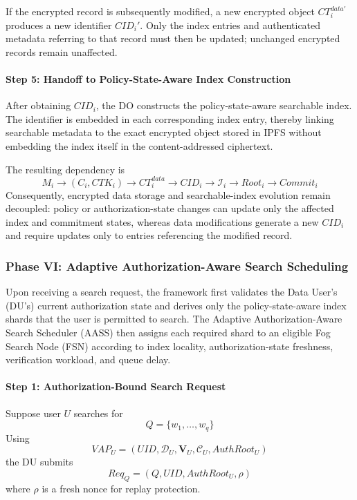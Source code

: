 \documentclass{ieeetj}
\theoremstyle{ieee-style}
\begin{document}
If the encrypted record is subsequently modified, a new encrypted object
$CT_i^{data\prime}$ produces a new identifier $CID_i'$. Only the index
entries and authenticated metadata referring to that record must then be
updated; unchanged encrypted records remain unaffected.

\paragraph*{Step 5: Handoff to Policy-State-Aware Index Construction}

After obtaining $CID_i$, the DO constructs the policy-state-aware
searchable index. The identifier is embedded in each corresponding index
entry, thereby linking searchable metadata to the exact encrypted object
stored in IPFS without embedding the index itself in the content-addressed
ciphertext.

The resulting dependency is
\begin{equation}
M_i
\rightarrow
(C_i,CTK_i)
\rightarrow
CT_i^{data}
\rightarrow
CID_i
\rightarrow
\mathcal{I}_i
\rightarrow
Root_i
\rightarrow
Commit_i
\label{eq:data-index-dependency}
\end{equation}
Consequently, encrypted data storage and searchable-index evolution remain
decoupled: policy or authorization-state changes can update only the
affected index and commitment states, whereas data modifications generate
a new $CID_i$ and require updates only to entries referencing the modified
record.


\subsubsection*{\textbf{Phase VI: Adaptive Authorization-Aware Search Scheduling}}

Upon receiving a search request, the framework first validates the
Data User's (DU's) current authorization state and derives only the
policy-state-aware index shards that the user is permitted to search.
The Adaptive Authorization-Aware Search Scheduler (AASS) then assigns
each required shard to an eligible Fog Search Node (FSN) according to
index locality, authorization-state freshness, verification workload,
and queue delay.

\paragraph*{Step 1: Authorization-Bound Search Request}

Suppose user $U$ searches for
\begin{equation}
Q=\{w_1,\ldots,w_q\}
\end{equation}
Using
\begin{equation}
VAP_U=
(UID,\mathcal{D}_U,\mathbf{V}_U,\mathcal{C}_U,AuthRoot_U)
\end{equation}
the DU submits
\begin{equation}
Req_Q=(Q,UID,AuthRoot_U,\rho)
\label{eq:search-request}
\end{equation}
where $\rho$ is a fresh nonce for replay protection.
\end{document}
